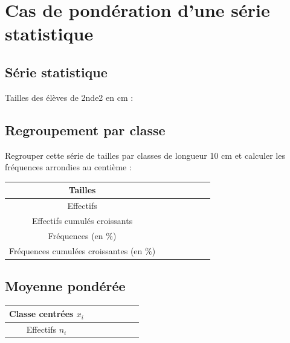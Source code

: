 \section{Cas de pondération d'une série statistique}

\subsection{Série statistique}
Tailles des élèves de 2nde2 en cm :
\vspace{0.1cm}

\ligne

\ligne

\subsection{Regroupement par classe}

Regrouper cette série de tailles par classes de longueur 10 cm et calculer les fréquences
arrondies au centième :
\begin{center}
\begin{tabular}{|c|c|c|c|c|c|c|}
\hline
Tailles & \phantom{$\dots\dots\dots$} & \phantom{$\dots\dots\dots$} & \phantom{$\dots\dots\dots$} &  \phantom{$\dots\dots\dots$} & \phantom{$\dots\dots\dots$} &\phantom{$\dots\dots\dots$}  \\
\hline
Effectifs &  &  &  &  &  & \\
\hline 
Effectifs cumulés croissants &  &  &  &  &  & \\
\hline 
Fréquences (en $\%$) &  &  &  &  &  &  \\
\hline 
Fréquences cumulées croissantes (en $\%$) &  &  &  &  &  &  \\
\hline 
\end{tabular}
\end{center}


\subsection{Moyenne pondérée}
\begin{center}
\begin{tabular}{|c|c|c|c|c|c|c|}
\hline
Classe centrées $x_i$ & \phantom{$\dots\dots$} & \phantom{$\dots\dots$} & \phantom{$\dots\dots$} & \phantom{$\dots\dots$} & \phantom{$\dots\dots$} &  \phantom{$\dots\dots$}  \\
\hline
Effectifs $n_i$ & \phantom{$\dots\dots$} &\phantom{$\dots\dots$} & \phantom{$\dots\dots$} & \phantom{$\dots\dots$} &\phantom{$\dots\dots$} & \phantom{$\dots\dots$}   \\
\hline

\end{tabular}
\end{center}

